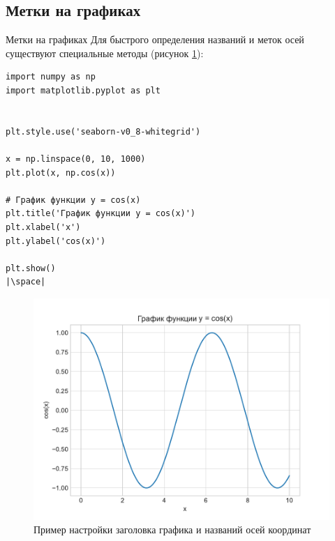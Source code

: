 \documentclass[aspectratio=169, mathserif]{beamer}	%
\begin{document}
\subsection{Метки на графиках}
\begin{frame}[fragile, label=m]{Метки на графиках}
\scriptsize
Для быстрого определения названий и меток осей существуют специальные методы (рисунок \ref{fig:fig_11}):
\vfill
\begin{minipage}{.4\textwidth}
\begin{verbatim}
import numpy as np
import matplotlib.pyplot as plt


plt.style.use('seaborn-v0_8-whitegrid')

x = np.linspace(0, 10, 1000)
plt.plot(x, np.cos(x))

# График функции y = cos(x)
plt.title('График функции y = cos(x)')
plt.xlabel('x')
plt.ylabel('cos(x)')

plt.show()
|\space|
\end{verbatim}
\end{minipage}
\begin{minipage}{.59\textwidth}
\begin{figure}[h!]
	\centering
	\includegraphics[width=.85\linewidth]{./pics/Figure_11}
	\caption{Пример настройки заголовка графика и названий осей координат}
	\label{fig:fig_11}
\end{figure}
\end{minipage}
\vfill
\end{frame}
\end{document}
